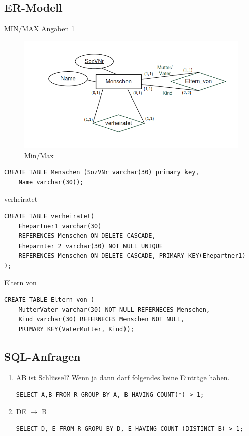 \subsection{ER-Modell}
MIN/MAX Angaben
\ref{img:MM}
\begin{figure}[h]
	\includegraphics[width = 16cm]{./Database/Images/6_1.png}
	\caption{Min/Max}
	\label{img:MM}
\end{figure}
\begin{lstlisting}
CREATE TABLE Menschen (SozVNr varchar(30) primary key, 
	Name varchar(30));
\end{lstlisting}
verheiratet
\begin{lstlisting}
CREATE TABLE verheiratet(
	Ehepartner1 varchar(30) 
	REFERENCES Menschen ON DELETE CASCADE, 
	Eheparnter 2 varchar(30) NOT NULL UNIQUE
	REFERENCES Menschen ON DELETE CASCADE, PRIMARY KEY(Ehepartner1)
);
\end{lstlisting}
Eltern von
\begin{lstlisting}
CREATE TABLE Eltern_von (
	MutterVater varchar(30) NOT NULL REFERNECES Menschen, 
	Kind varchar(30) REFERNECES Menschen NOT NULL, 
	PRIMARY KEY(VaterMutter, Kind));
\end{lstlisting}
\subsection{SQL-Anfragen}
\begin{enumerate}
\item AB ist Schlüssel? Wenn ja dann darf folgendes keine Einträge haben.
\begin{lstlisting}
SELECT A,B FROM R GROUP BY A, B HAVING COUNT(*) > 1;
\end{lstlisting}
\item DE $\to$ B
\begin{lstlisting}
SELECT D, E FROM R GROPU BY D, E HAVING COUNT (DISTINCT B) > 1;
\end{lstlisting}
\end{enumerate}
